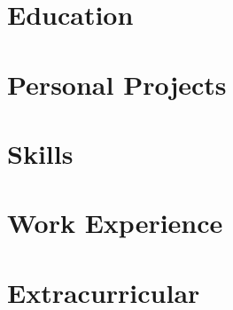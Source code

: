 \documentclass[compact]{mycv}
\author{Nicholas Todoroff}
\begin{document}
\maketitle

\part{Education}
    
\part{Personal Projects}
    
\part{Skills}
    
\part{Work Experience}
    
\part{Extracurricular}
    
\end{document}

